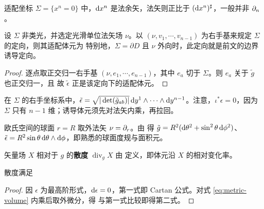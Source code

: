 \begin{remark}
    适配坐标 $\Sigma=\{x^n=0\}$ 中，$\dd x^n$ 是法余矢，法矢则正比于 $(\dd x^n)^\sharp$，一般并非 $\partial_n$。
\end{remark}

\begin{theorem}
    设 $\Sigma$ 非类光，并选定光滑单位法矢场 $\nu$。以 $(\nu,v_1,\cdots,v_{n-1})$ 为右手基来规定 $\Sigma$ 的定向，则其适配体元为
    特别地，$\Sigma=\partial D$ 且 $\nu$ 外向时，此定向就是前文的边界诱导定向。
\end{theorem}
\begin{proof}
    逐点取正交归一右手基 $(\nu,e_1,\cdots,e_{n-1})$，其中 $e_a$ 切于 $\Sigma$。则 $e_a$ 关于 $\tilde g$ 也正交归一，且
    故 $\tilde\epsilon$ 正是该定向下的适配体元。
\end{proof}

在 $\Sigma$ 的右手坐标系中，$\tilde\epsilon=\sqrt{|\det(\tilde g_{ab})|}\,\dd y^1\wedge\cdots\wedge\dd y^{n-1}$。注意，$\iota^*\epsilon=0$，因为 $\Sigma$ 只有 $n-1$ 维；诱导体元须先对法矢内乘，再拉回。

\begin{example}
    欧氏空间的球面 $r=R$ 取外法矢 $\nu=\partial_r$。由
    得 $\tilde g=R^2(\dd\theta^2+\sin^2\theta\,\dd\phi^2)$、$\tilde\epsilon=R^2\sin\theta\,\dd\theta\wedge\dd\phi$，即熟悉的球面度规与面积元。
\end{example}

\begin{definition}
    矢量场 $X$ 相对于 $g$ 的\textbf{散度} $\operatorname{div}_gX$ 由
    定义，即体元沿 $X$ 的相对变化率。
\end{definition}

\begin{theorem}
    散度满足
\end{theorem}
\begin{proof}
    因 $\epsilon$ 为最高阶形式，$\dd\epsilon=0$，第一式即 Cartan 公式。对式 \eqref{eq:metric-volume} 内乘后取外微分，得
    与第一式比较即得第二式。
\end{proof}

